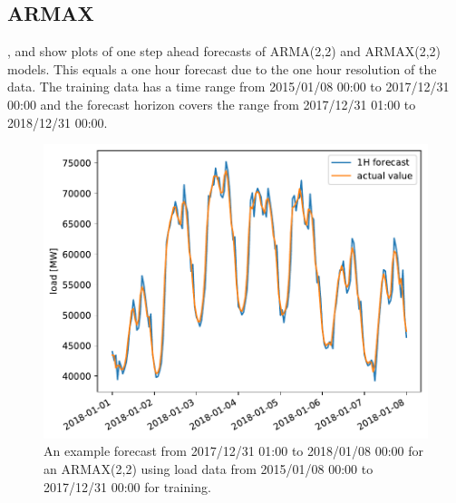 \subsection*{ARMAX}

,  and  show plots of one step ahead forecasts of ARMA(2,2) and ARMAX(2,2) models. This equals a one hour forecast due to the one hour resolution of the data. The training data has a time range from 2015/01/08 00:00 to 2017/12/31 00:00 and the forecast horizon covers the range from 2017/12/31 01:00 to 2018/12/31 00:00.\\

\begin{figure}[h!]%
\centering
\includegraphics[width=\textwidth]{plots/ARMAXfc/ARMAX_p2q2_data2015to2017_fcto2018123100_plot_range2018010100_2018010800}%
\caption{An example forecast from 2017/12/31 01:00 to 2018/01/08 00:00 for an ARMAX(2,2) using load data from 2015/01/08 00:00 to 2017/12/31 00:00 for training.}%
\label{fig:armax_fc}%
\end{figure}

